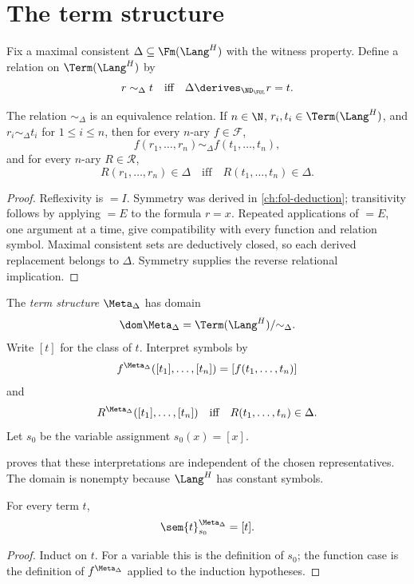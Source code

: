 \section{The term structure}
\label{sec:fol-metatheory-02}

Fix a maximal consistent \(\Delta\subseteq\Fm(\Lang^H)\) with the witness
property.  Define a relation on \(\Term(\Lang^H)\) by
\[
 r\sim_\Delta t
 \quad\text{iff}\quad
 \Delta\derives_{\ND_{\FOL}}r=t.
\]

\begin{lemma}
\label{lem:equality-congruence}
The relation \(\sim_\Delta\) is an equivalence relation.  If
\(n\in\N\), \(r_i,t_i\in\Term(\Lang^H)\), and
\(r_i\sim_\Delta t_i\) for \(1\leq i\leq n\), then for every
\(n\)-ary \(f\in\mathcal F\),
\[
 f(r_1,\ldots,r_n)\sim_\Delta f(t_1,\ldots,t_n),
\]
and for every \(n\)-ary \(R\in\mathcal R\),
\[
 R(r_1,\ldots,r_n)\in\Delta
 \quad\text{iff}\quad
 R(t_1,\ldots,t_n)\in\Delta.
\]
\end{lemma}
\begin{proof}
Reflexivity is \(=I\).  Symmetry was derived in
\cref{ch:fol-deduction}; transitivity follows by applying \(=E\) to the
formula \(r=x\).  Repeated applications of \(=E\), one argument at a time,
give compatibility with every function and relation symbol.  Maximal
consistent sets are deductively closed, so each derived replacement belongs
to \(\Delta\).  Symmetry supplies the reverse relational implication.
\end{proof}

\begin{definition}
The \emph{term structure} \(\Meta_\Delta\) has domain
\[
 \dom\Meta_\Delta
 =\Term(\Lang^H)/{\sim_\Delta}.
\]
Write \([t]\) for the class of \(t\).  Interpret symbols by
\[
 f^{\Meta_\Delta}([t_1],\ldots,[t_n])
 =[f(t_1,\ldots,t_n)]
\]
and
\[
 R^{\Meta_\Delta}([t_1],\ldots,[t_n])
 \quad\text{iff}\quad
 R(t_1,\ldots,t_n)\in\Delta.
\]
Let \(s_0\) be the variable assignment \(s_0(x)=[x]\).
\end{definition}

 proves that these interpretations are
independent of the chosen representatives.  The domain is nonempty
because \(\Lang^H\) has constant symbols.

\begin{lemma}
\label{lem:term-model-evaluation}
For every term \(t\),
\[
 \sem{t}^{\Meta_\Delta}_{s_0}=[t].
\]
\end{lemma}
\begin{proof}
Induct on \(t\).  For a variable this is the definition of \(s_0\); the
function case is the definition of \(f^{\Meta_\Delta}\) applied to the
induction hypotheses.
\end{proof}

